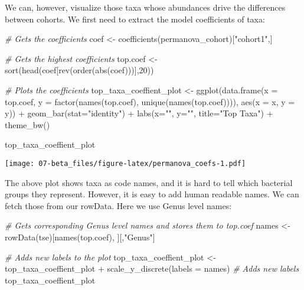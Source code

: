 \documentclass[
  oneside]{book}
\newenvironment{Shaded}{\begin{snugshade}}{\end{snugshade}}
\newcommand{\AttributeTok}[1]{\textcolor[rgb]{0.77,0.63,0.00}{#1}}
\newcommand{\CommentTok}[1]{\textcolor[rgb]{0.56,0.35,0.01}{\textit{#1}}}
\newcommand{\DecValTok}[1]{\textcolor[rgb]{0.00,0.00,0.81}{#1}}
\newcommand{\FunctionTok}[1]{\textcolor[rgb]{0.00,0.00,0.00}{#1}}
\newcommand{\NormalTok}[1]{#1}
\newcommand{\OtherTok}[1]{\textcolor[rgb]{0.56,0.35,0.01}{#1}}
\newcommand{\SpecialCharTok}[1]{\textcolor[rgb]{0.00,0.00,0.00}{#1}}
\newcommand{\StringTok}[1]{\textcolor[rgb]{0.31,0.60,0.02}{#1}}
\begin{document}
We can, however, visualize those taxa whose abundances drive the
differences between cohorts. We first need to extract the model
coefficients of taxa:

\begin{Shaded}
\begin{Highlighting}[]
\CommentTok{\# Gets the coefficients}
\NormalTok{coef }\OtherTok{\textless{}{-}} \FunctionTok{coefficients}\NormalTok{(permanova\_cohort)[}\StringTok{"cohort1"}\NormalTok{,]}

\CommentTok{\# Gets the highest coefficients}
\NormalTok{top.coef }\OtherTok{\textless{}{-}} \FunctionTok{sort}\NormalTok{(}\FunctionTok{head}\NormalTok{(coef[}\FunctionTok{rev}\NormalTok{(}\FunctionTok{order}\NormalTok{(}\FunctionTok{abs}\NormalTok{(coef)))],}\DecValTok{20}\NormalTok{))}

\CommentTok{\# Plots the coefficients}
\NormalTok{top\_taxa\_coeffient\_plot }\OtherTok{\textless{}{-}} \FunctionTok{ggplot}\NormalTok{(}\FunctionTok{data.frame}\NormalTok{(}\AttributeTok{x =}\NormalTok{ top.coef,}
                                             \AttributeTok{y =} \FunctionTok{factor}\NormalTok{(}\FunctionTok{names}\NormalTok{(top.coef),}
                         \FunctionTok{unique}\NormalTok{(}\FunctionTok{names}\NormalTok{(top.coef)))),}
                                  \FunctionTok{aes}\NormalTok{(}\AttributeTok{x =}\NormalTok{ x, }\AttributeTok{y =}\NormalTok{ y)) }\SpecialCharTok{+}
  \FunctionTok{geom\_bar}\NormalTok{(}\AttributeTok{stat=}\StringTok{"identity"}\NormalTok{) }\SpecialCharTok{+}
  \FunctionTok{labs}\NormalTok{(}\AttributeTok{x=}\StringTok{""}\NormalTok{, }\AttributeTok{y=}\StringTok{""}\NormalTok{, }\AttributeTok{title=}\StringTok{"Top Taxa"}\NormalTok{) }\SpecialCharTok{+}
  \FunctionTok{theme\_bw}\NormalTok{()}

\NormalTok{top\_taxa\_coeffient\_plot}
\end{Highlighting}
\end{Shaded}

\texttt{[image: 07-beta\_files/figure-latex/permanova\_coefs-1.pdf]}

The above plot shows taxa as code names, and it is hard to tell which
bacterial groups they represent. However, it is easy to add human readable
names. We can fetch those from our rowData. Here we use Genus level names:

\begin{Shaded}
\begin{Highlighting}[]
\CommentTok{\# Gets corresponding Genus level names and stores them to top.coef}
\NormalTok{names }\OtherTok{\textless{}{-}} \FunctionTok{rowData}\NormalTok{(tse)[}\FunctionTok{names}\NormalTok{(top.coef), ][,}\StringTok{"Genus"}\NormalTok{]}

\CommentTok{\# Adds new labels to the plot}
\NormalTok{top\_taxa\_coeffient\_plot }\OtherTok{\textless{}{-}}\NormalTok{ top\_taxa\_coeffient\_plot }\SpecialCharTok{+}
  \FunctionTok{scale\_y\_discrete}\NormalTok{(}\AttributeTok{labels =}\NormalTok{ names) }\CommentTok{\# Adds new labels}
\NormalTok{top\_taxa\_coeffient\_plot}
\end{Highlighting}
\end{Shaded}
\end{document}
